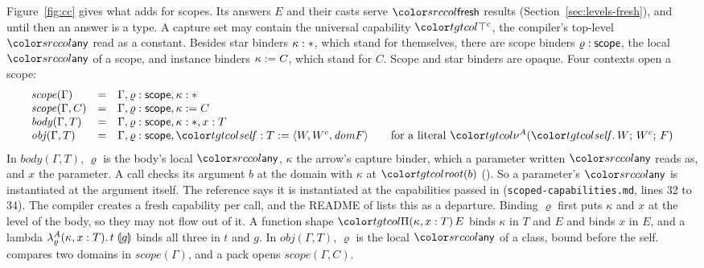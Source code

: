 Figure~\ref{fig:cc} gives what \treeCC adds for scopes. Its answers $E$ and their casts serve $\cfresh$ results (Section~\ref{sec:levels-fresh}), and until then an answer is a type. A capture set may contain the universal capability $\topc$, the compiler's top-level $\cany$ read as a constant. Besides star binders $\kappa : \ast$, which stand for themselves, there are scope binders $\varrho : \mathsf{scope}$, the local $\cany$ of a scope, and instance binders $\kappa \mathrel{:=}C$, which stand for $C$. Scope and star binders are opaque. Four contexts open a scope:
\[
\begin{array}{@{}lcl@{}}
\mathit{scope}(\Gamma) & = & \Gamma, \varrho : \scopeb, \kappa : \cstar \\
\mathit{scope}(\Gamma, C) & = & \Gamma, \varrho : \scopeb, \kappa \instb{C} \\
\mathit{body}(\Gamma, T) & = & \Gamma, \varrho : \scopeb, \kappa : \cstar, x : T \\
\mathit{obj}(\Gamma, T) & = & \Gamma, \varrho : \scopeb, \self : T \mathrel{:=} \langle W, W^{c}, \dom F\rangle \qquad \text{for a literal } \litc{A}{W}{W^{c}}{F}
\end{array}
\]
In $\mathit{body}(\Gamma, T)$, $\varrho$ is the body's local $\cany$, $\kappa$ the arrow's capture binder, which a parameter written $\cany$ reads as, and $x$ the parameter. A call checks its argument $b$ at the domain with $\kappa$ at $\rt{b}$ (). So a parameter's $\cany$ is instantiated at the argument itself. The reference says it is instantiated at the capabilities passed in (\texttt{scoped-capabilities.md}, lines 32 to 34). The compiler creates a fresh capability per call, and the README of \treeCC lists this as a departure. Binding $\varrho$ first puts $\kappa$ and $x$ at the level of the body, so they may not flow out of it. A function shape $\pit[\kappa, x]{T}{E}$ binds $\kappa$ in $T$ and $E$ and binds $x$ in $E$, and a lambda $\lambda^{A}_{\varrho}(\kappa, x : T).\,t\;\mathopen{\llparenthesis}g\mathclose{\rrparenthesis}$ binds all three in $t$ and $g$. In $\mathit{obj}(\Gamma, T)$, $\varrho$ is the local $\cany$ of a class, bound before the self.  compares two domains in $\mathit{scope}(\Gamma)$, and a pack opens $\mathit{scope}(\Gamma, C)$.

